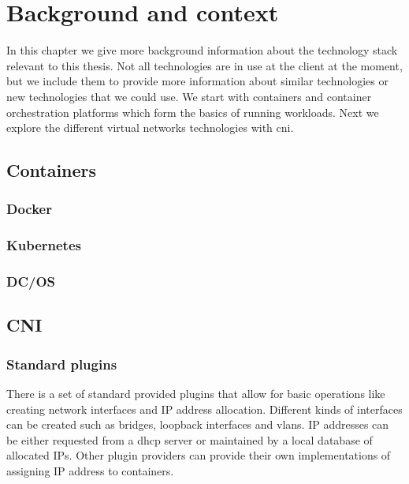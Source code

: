 \chapter{Background and context}

In this chapter we give more background information about the technology stack relevant to this thesis. Not all technologies are in use at the client at the moment, but we include them to provide more information about similar technologies or new technologies that we could use. We start with containers and container orchestration platforms which form the basics of running workloads. Next we explore the different virtual networks technologies with \gls{cni}.

\section{Containers}
\subsection{Docker}
\subsection{Kubernetes}
\subsection{DC/OS}

\section{CNI}

\subsection{Standard plugins}
There is a set of standard provided plugins\cite{cni_plugin} that allow for basic operations like creating network interfaces and IP address allocation. Different kinds of interfaces can be created such as bridges, loopback interfaces and \glspl{vlan}. IP addresses can be either requested from a \gls{dhcp} server or maintained by a local database of allocated IPs. Other plugin providers can provide their own implementations of assigning IP address to containers.

